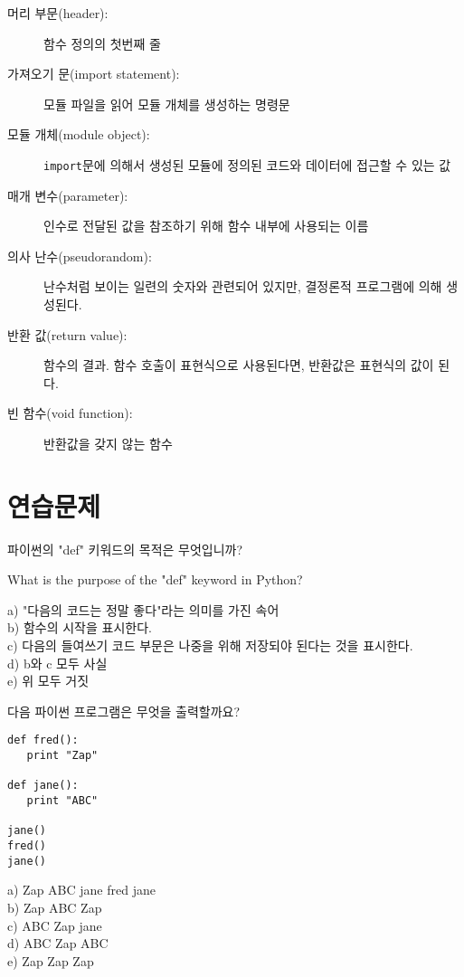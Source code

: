 \begin{description}
\item[머리 부문(header):] 함수 정의의 첫번째 줄

\item[가져오기 문(import statement):] 모듈 파일을 읽어 모듈 개체를 생성하는 명령문

\item[모듈 개체(module object):] {\tt import}문에 의해서 생성된 모듈에 정의된 코드와 데이터에 접근할 수 있는 값

\item[매개 변수(parameter):] 인수로 전달된 값을 참조하기 위해 함수 내부에 사용되는 이름

\item[의사 난수(pseudorandom):] 난수처럼 보이는 일련의 숫자와 관련되어 있지만, 결정론적 프로그램에 의해 생성된다.

\item[반환 값(return value):] 함수의 결과. 함수 호출이 표현식으로 사용된다면, 반환값은 표현식의 값이 된다. 

\item[빈 함수(void function):] 반환값을 갖지 않는 함수


\end{description}


\section{연습문제}

\begin{ex}
파이썬의 "def" 키워드의 목적은 무엇입니까?

What is the purpose of the "def" keyword in Python?

a) "다음의 코드는 정말 좋다"라는 의미를 가진 속어\\
b) 함수의 시작을 표시한다.\\
c) 다음의 들여쓰기 코드 부문은 나중을 위해 저장되야 된다는 것을 표시한다.\\
d) b와 c 모두 사실\\
e) 위 모두 거짓
\end{ex}

\begin{ex}

다음 파이썬 프로그램은 무엇을 출력할까요?

\beforeverb
\begin{verbatim}
def fred():
   print "Zap"

def jane():
   print "ABC"

jane()
fred()
jane()
\end{verbatim}
\afterverb
%
a) Zap ABC jane fred jane\\
b) Zap ABC Zap\\
c) ABC Zap jane\\
d) ABC Zap ABC\\
e) Zap Zap Zap
\end{ex}

